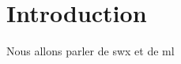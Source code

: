 \section*{Introduction}


Nous allons parler de \acrlong{swx} et de \acrshort{ml}

\cite{Kondrashov_2014}


